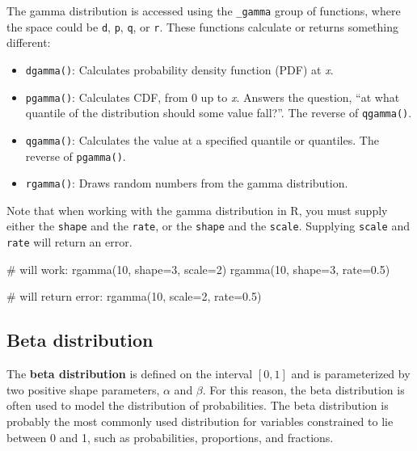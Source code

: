 \documentclass[
  13,
  letterpaper,
]{report}
\newenvironment{Shaded}{\begin{snugshade}}{\end{snugshade}}
\newcommand{\AttributeTok}[1]{\textcolor[rgb]{0.40,0.45,0.13}{#1}}
\newcommand{\CommentTok}[1]{\textcolor[rgb]{0.37,0.37,0.37}{#1}}
\newcommand{\DecValTok}[1]{\textcolor[rgb]{0.68,0.00,0.00}{#1}}
\newcommand{\FloatTok}[1]{\textcolor[rgb]{0.68,0.00,0.00}{#1}}
\newcommand{\FunctionTok}[1]{\textcolor[rgb]{0.28,0.35,0.67}{#1}}
\newcommand{\NormalTok}[1]{\textcolor[rgb]{0.00,0.23,0.31}{#1}}
\providecommand{\tightlist}{%
  \setlength{\itemsep}{0pt}\setlength{\parskip}{0pt}}
\begin{document}
The gamma distribution is accessed using the \texttt{\_gamma} group of
functions, where the space could be \texttt{d}, \texttt{p}, \texttt{q},
or \texttt{r}. These functions calculate or returns something different:

\begin{itemize}
\tightlist
\item
  \texttt{dgamma()}: Calculates probability density function (PDF) at
  \emph{x}.
\item
  \texttt{pgamma()}: Calculates CDF, from 0 up to \emph{x}. Answers the
  question, ``at what quantile of the distribution should some value
  fall?''. The reverse of \texttt{qgamma()}.
\item
  \texttt{qgamma()}: Calculates the value at a specified quantile or
  quantiles. The reverse of \texttt{pgamma()}.
\item
  \texttt{rgamma()}: Draws random numbers from the gamma distribution.
\end{itemize}

Note that when working with the gamma distribution in R, you must supply
either the \texttt{shape} and the \texttt{rate}, or the \texttt{shape}
and the \texttt{scale}. Supplying \texttt{scale} and \texttt{rate} will
return an error.

\begin{Shaded}
\begin{Highlighting}[]
\CommentTok{\# will work:}
\FunctionTok{rgamma}\NormalTok{(}\DecValTok{10}\NormalTok{, }\AttributeTok{shape=}\DecValTok{3}\NormalTok{, }\AttributeTok{scale=}\DecValTok{2}\NormalTok{)}
\FunctionTok{rgamma}\NormalTok{(}\DecValTok{10}\NormalTok{, }\AttributeTok{shape=}\DecValTok{3}\NormalTok{, }\AttributeTok{rate=}\FloatTok{0.5}\NormalTok{)}

\CommentTok{\# will return error:}
\FunctionTok{rgamma}\NormalTok{(}\DecValTok{10}\NormalTok{, }\AttributeTok{scale=}\DecValTok{2}\NormalTok{, }\AttributeTok{rate=}\FloatTok{0.5}\NormalTok{)}
\end{Highlighting}
\end{Shaded}

\subsection{Beta distribution}\label{sec-dist-beta}

The \textbf{beta distribution} is defined on the interval \([0,1]\) and
is parameterized by two positive shape parameters, \(\alpha\) and
\(\beta\). For this reason, the beta distribution is often used to model
the distribution of probabilities. The beta distribution is probably the
most commonly used distribution for variables constrained to lie between
0 and 1, such as probabilities, proportions, and fractions.
\end{document}
